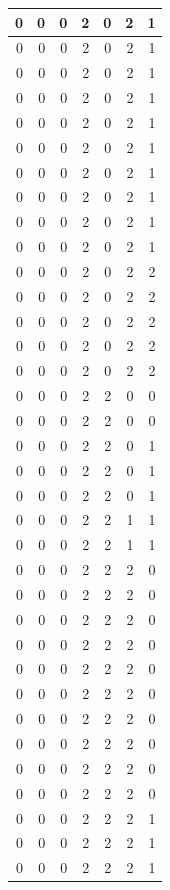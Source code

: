 \documentclass[
  12pt,
]{krantz}
\begin{document}
\begin{tabular}{r|r|r|r|r|r|r}
\hline
0 & 0 & 0 & 2 & 0 & 2 & 1\\
\hline
0 & 0 & 0 & 2 & 0 & 2 & 1\\
\hline
0 & 0 & 0 & 2 & 0 & 2 & 1\\
\hline
0 & 0 & 0 & 2 & 0 & 2 & 1\\
\hline
0 & 0 & 0 & 2 & 0 & 2 & 1\\
\hline
0 & 0 & 0 & 2 & 0 & 2 & 1\\
\hline
0 & 0 & 0 & 2 & 0 & 2 & 1\\
\hline
0 & 0 & 0 & 2 & 0 & 2 & 1\\
\hline
0 & 0 & 0 & 2 & 0 & 2 & 1\\
\hline
0 & 0 & 0 & 2 & 0 & 2 & 1\\
\hline
0 & 0 & 0 & 2 & 0 & 2 & 2\\
\hline
0 & 0 & 0 & 2 & 0 & 2 & 2\\
\hline
0 & 0 & 0 & 2 & 0 & 2 & 2\\
\hline
0 & 0 & 0 & 2 & 0 & 2 & 2\\
\hline
0 & 0 & 0 & 2 & 0 & 2 & 2\\
\hline
0 & 0 & 0 & 2 & 2 & 0 & 0\\
\hline
0 & 0 & 0 & 2 & 2 & 0 & 0\\
\hline
0 & 0 & 0 & 2 & 2 & 0 & 1\\
\hline
0 & 0 & 0 & 2 & 2 & 0 & 1\\
\hline
0 & 0 & 0 & 2 & 2 & 0 & 1\\
\hline
0 & 0 & 0 & 2 & 2 & 1 & 1\\
\hline
0 & 0 & 0 & 2 & 2 & 1 & 1\\
\hline
0 & 0 & 0 & 2 & 2 & 2 & 0\\
\hline
0 & 0 & 0 & 2 & 2 & 2 & 0\\
\hline
0 & 0 & 0 & 2 & 2 & 2 & 0\\
\hline
0 & 0 & 0 & 2 & 2 & 2 & 0\\
\hline
0 & 0 & 0 & 2 & 2 & 2 & 0\\
\hline
0 & 0 & 0 & 2 & 2 & 2 & 0\\
\hline
0 & 0 & 0 & 2 & 2 & 2 & 0\\
\hline
0 & 0 & 0 & 2 & 2 & 2 & 0\\
\hline
0 & 0 & 0 & 2 & 2 & 2 & 0\\
\hline
0 & 0 & 0 & 2 & 2 & 2 & 0\\
\hline
0 & 0 & 0 & 2 & 2 & 2 & 1\\
\hline
0 & 0 & 0 & 2 & 2 & 2 & 1\\
\hline
0 & 0 & 0 & 2 & 2 & 2 & 1\\

\end{tabular}
\end{document}
